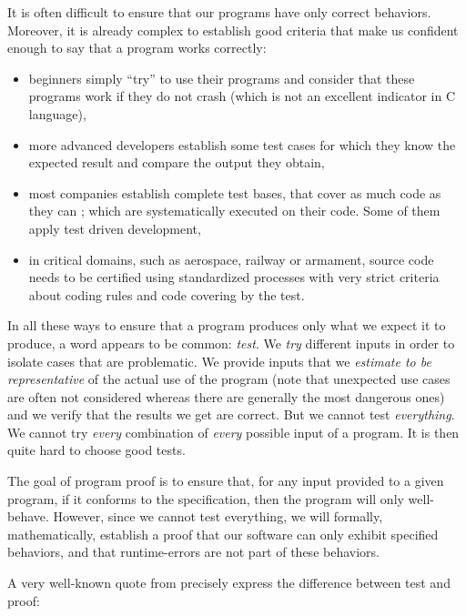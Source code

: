 

It is often difficult to ensure that our programs have only correct
behaviors. Moreover, it is already complex to establish good criteria
that make us confident enough to say that a program works correctly:
\begin{itemize}
\item
  beginners simply ``try'' to use their programs and consider that
  these programs work if they do not crash (which is not an excellent
  indicator in C language),
\item
  more advanced developers establish some test cases for which they know
  the expected result and compare the output they obtain,
\item
  most companies establish complete test bases, that cover as much
  code as they can ; which are systematically executed on their code.
  Some of them apply test driven development,
\item
  in critical domains, such as aerospace, railway or armament, source
  code needs to be certified using standardized processes with very
  strict criteria about coding rules and code covering by the test.
\end{itemize}

In all these ways to ensure that a program produces only what we expect
it to produce, a word appears to be common: \emph{test}. We \emph{try}
different inputs in order to isolate cases that are problematic. We
provide inputs that we \emph{estimate to be representative} of the
actual use of the program (note that unexpected use cases are often not
considered whereas there are generally the most dangerous ones) and we
verify that the results we get are correct. But we cannot test
\emph{everything}. We cannot try \emph{every} combination of
\emph{every} possible input of a program. It is then quite hard to
choose good tests.


The goal of program proof is to ensure that, for any input provided to a
given program, if it conforms to the specification, then the program will
only well-behave. However, since we cannot test everything, we will
formally, mathematically, establish a proof that our software can only
exhibit specified behaviors, and that runtime-errors are not part of
these behaviors.



A very well-known quote from 
precisely express the difference between test and proof:



